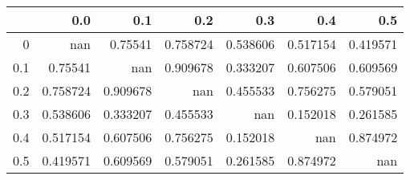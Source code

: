 \begin{tabular}{rrrrrrr}
\toprule
     &        0.0 &        0.1 &        0.2 &        0.3 &        0.4 &        0.5 \\
\midrule
 0   & nan        &   0.75541  &   0.758724 &   0.538606 &   0.517154 &   0.419571 \\
 0.1 &   0.75541  & nan        &   0.909678 &   0.333207 &   0.607506 &   0.609569 \\
 0.2 &   0.758724 &   0.909678 & nan        &   0.455533 &   0.756275 &   0.579051 \\
 0.3 &   0.538606 &   0.333207 &   0.455533 & nan        &   0.152018 &   0.261585 \\
 0.4 &   0.517154 &   0.607506 &   0.756275 &   0.152018 & nan        &   0.874972 \\
 0.5 &   0.419571 &   0.609569 &   0.579051 &   0.261585 &   0.874972 & nan        \\
\bottomrule
\end{tabular}